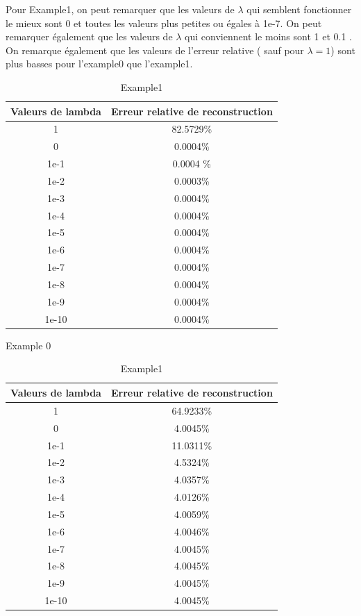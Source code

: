 \documentclass[a4paper, 12pt]{article}
\begin{document}
Pour Example1, on peut remarquer que les valeurs de $\lambda$ qui semblent fonctionner le mieux sont 0 et toutes les valeurs plus petites ou égales à 1e-7. On peut remarquer également que les valeurs de $\lambda$ qui conviennent le moins sont 1 et 0.1 .\\

On remarque également que les valeurs de l'erreur relative ( sauf pour $\lambda=1$) sont plus basses pour l'example0 que l'example1. 
	\begin{table}[!htbp]

	\begin{center}
		\begin{tabular}{c|c}
			 Valeurs de lambda & Erreur relative de reconstruction  \\
			\hline
    1        & 82.5729\% \\
    0        & 0.0004\% \\
    1e-1   & 0.0004 \%\\
    1e-2   & 0.0003\% \\
    1e-3   & 0.0004\% \\
    1e-4   & 0.0004\% \\
    1e-5   & 0.0004\% \\
    1e-6   & 0.0004\% \\
    1e-7   & 0.0004\% \\
    1e-8   & 0.0004\% \\
    1e-9   & 0.0004\% \\
    1e-10 & 0.0004\% \\
			

		\end{tabular}
	\end{center}
	\caption{Example 0}

	\begin{center}
	\begin{tabular}{c|c}
		   Valeurs de lambda & Erreur relative de reconstruction  \\
			\hline
    1        &  64.9233\% \\
    0        & 4.0045\% \\
    1e-1   & 11.0311\% \\
    1e-2   & 4.5324\% \\
    1e-3   & 4.0357\% \\
    1e-4   & 4.0126\% \\
    1e-5   & 4.0059\% \\
    1e-6   & 4.0046\% \\
    1e-7   & 4.0045\% \\
    1e-8   & 4.0045\% \\
    1e-9   & 4.0045\% \\
    1e-10 & 4.0045\% \\
			
			
	\end{tabular}
	\end{center}

	\caption{Example1}
	\end{table}
	\newpage
\end{document}
